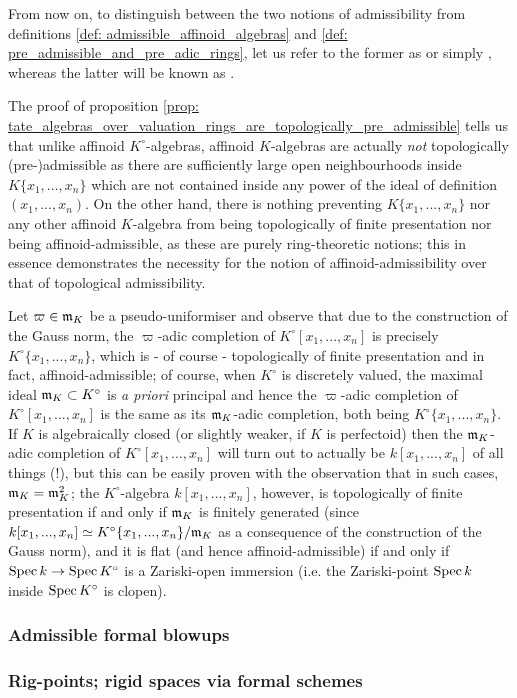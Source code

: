             \begin{convention} \label{conv: admissibility_and_topological_admissibility}
                From now on, to distinguish between the two notions of admissibility from definitions \ref{def: admissible_affinoid_algebras} and \ref{def: pre_admissible_and_pre_adic_rings}, let us refer to the former as  or simply , whereas the latter will be known as .
            \end{convention}
            \begin{remark}
                The proof of proposition \ref{prop: tate_algebras_over_valuation_rings_are_topologically_pre_admissible} tells us that unlike affinoid $K^{\circ}$-algebras, affinoid $K$-algebras are actually \textit{not} topologically (pre-)admissible as there are sufficiently large open neighbourhoods inside $K\{x_1, ..., x_n\}$ which are not contained inside any power of the ideal of definition $(x_1, ..., x_n)$. On the other hand, there is nothing preventing $K\{x_1, ..., x_n\}$ nor any other affinoid $K$-algebra from being topologically of finite presentation nor being affinoid-admissible, as these are purely ring-theoretic notions; this in essence demonstrates the necessity for the notion of affinoid-admissibility over that of topological admissibility.
            \end{remark}
            \begin{example}
                Let $\varpi \in \mathfrak{m}_K$ be a pseudo-uniformiser and observe that due to the construction of the Gauss norm, the $\varpi$-adic completion of $K^{\circ}[x_1, ..., x_n]$ is precisely $K^{\circ}\{x_1, ..., x_n\}$, which is - of course - topologically of finite presentation and in fact, affinoid-admissible; of course, when $K^{\circ}$ is discretely valued, the maximal ideal $\mathfrak{m}_K \subset K^{\circ}$ is \textit{a priori} principal and hence the $\varpi$-adic completion of $K^{\circ}[x_1, ..., x_n]$ is the same as its $\mathfrak{m}_K$-adic completion, both being $K^{\circ}\{x_1, ..., x_n\}$. If $K$ is algebraically closed (or slightly weaker, if $K$ is perfectoid) then the $\mathfrak{m}_K$-adic completion of $K^{\circ}[x_1, ..., x_n]$ will turn out to actually be $k[x_1, ..., x_n]$ of all things (!), but this can be easily proven with the observation that in such cases, $\mathfrak{m}_K = \mathfrak{m}_K^2$; the $K^{\circ}$-algebra $k[x_1, ..., x_n]$, however, is topologically of finite presentation if and only if $\mathfrak{m}_K$ is finitely generated (since $k[x_1, ..., x_n] \simeq K^{\circ}\{x_1, ..., x_n\}/\mathfrak{m}_K$ as a consequence of the construction of the Gauss norm), and it is flat (and hence affinoid-admissible) if and only if $\operatorname{Spec} k \to \operatorname{Spec} K^{\circ}$ is a Zariski-open immersion (i.e. the Zariski-point $\operatorname{Spec} k$ inside $\operatorname{Spec} K^{\circ}$ is clopen). 
            \end{example}
        
        \subsubsection{Admissible formal blowups}
        
        \subsubsection{Rig-points; rigid spaces via formal schemes}